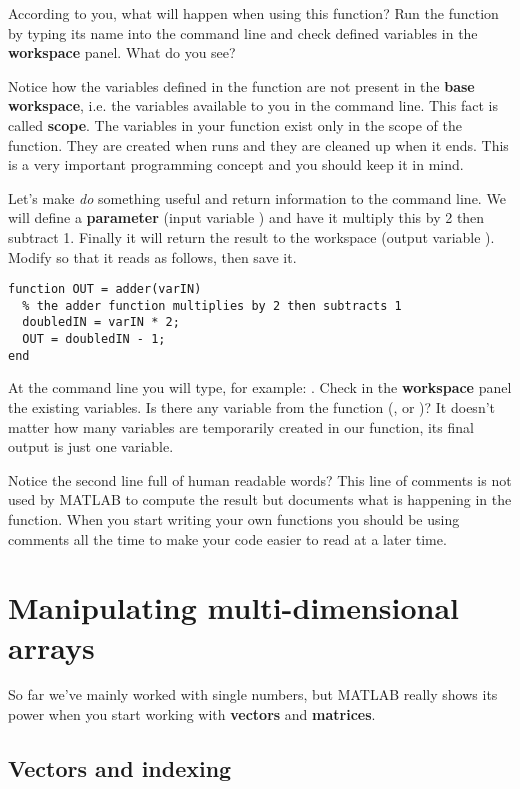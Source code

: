 \documentclass{article}
\begin{document}
According to you, what will happen when using this function?
Run the function by typing its name into the command line and check defined variables in the \textbf{workspace} panel. What do you see?

Notice how the variables defined in the  function are not present in the \textbf{base workspace}, i.e. the variables available to you in the command line.
This fact is called \textbf{scope}.
The variables in your  function exist only in the scope of the  function.
They are created when  runs and they are cleaned up when it ends.
This is a very important programming concept and you should keep it in mind.

Let's make  \emph{do} something useful and return information to the command line.
We will define a \textbf{parameter} (input variable ) and have it multiply this by 2 then subtract 1.
Finally it will return the result to the workspace (output variable ).
Modify  so that it reads as follows, then save it.
\begin{lstlisting}
function OUT = adder(varIN)
  % the adder function multiplies by 2 then subtracts 1
  doubledIN = varIN * 2;
  OUT = doubledIN - 1;
end
\end{lstlisting}

At the command line you will type, for example: .
Check in the \textbf{workspace} panel the existing variables.
Is there any variable from the function (,  or )?
It doesn't matter how many variables are temporarily created in our function, its final output is just one variable.

Notice the second line full of human readable words?
This line of comments is not used by MATLAB to compute the result but documents what is happening in the function.
When you start writing your own functions you should be using comments all the time to make your code easier to read at a later time.


\section{Manipulating multi-dimensional arrays}

So far we've mainly worked with single numbers, but MATLAB really shows its power when you start working with \textbf{vectors} and  \textbf{matrices}.

\subsection*{Vectors and indexing}
\end{document}
